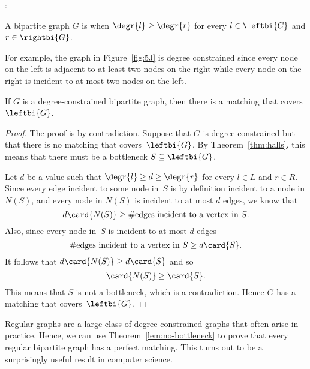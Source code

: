 \begin{editingnotes}
:
\end{editingnotes}

\begin{definition}\label{degree-constrained_def}
  A bipartite graph $G$ is  when $\degr{l} \geq
  \degr{r}$ for every $l \in \leftbi{G}$ and $r \in \rightbi{G}$.
\end{definition}

For example, the graph in Figure~\ref{fig:5J} is degree constrained
since every node on the left is adjacent to at least two nodes on the
right while every node on the right is incident to at most two nodes
on the left.

\begin{theorem}\label{lem:no-bottleneck}
  If $G$ is a degree-constrained bipartite graph, then there is a matching
  that covers~$\leftbi{G}$.
\end{theorem}

\begin{proof}
  The proof is by contradiction.  Suppose that $G$ is degree constrained
  but that there is no matching that covers~$\leftbi{G}$.  By
  Theorem~\ref{thm:halls}, this means that there must be a bottleneck $S
  \subseteq \leftbi{G}$.

  Let $d$ be a value such that $\degr{l} \ge d \ge \degr{r}$ for every $l
  \in L$ and $r \in R$.  Since every edge incident to some node in~$S$ is
  by definition incident to a node in $N(S)$, and every node in $N(S)$ is
  incident to at most $d$ edges, we know that
\[
d\card{N(S)} \geq \#\text{edges incident to a vertex in $S$}.
\]
Also, since every node in~$S$ is incident to at most $d$ edges
\[
\#\text{edges incident to a vertex in $S$} \geq d\card{S}.
\]
It follows that $d\card{N(S)} \ge d\card{S}$ and so
\begin{equation*}
    \card{N(S)} \ge \card{S}.
\end{equation*}
This means that $S$ is not a bottleneck, which is a contradiction.
Hence $G$ has a matching that covers~$\leftbi{G}$.
\end{proof}

Regular graphs are a large class of degree constrained graphs that often
arise in practice.  Hence, we can use Theorem~\ref{lem:no-bottleneck} to
prove that every regular bipartite graph has a perfect matching.  This
turns out to be a surprisingly useful result in computer science.

